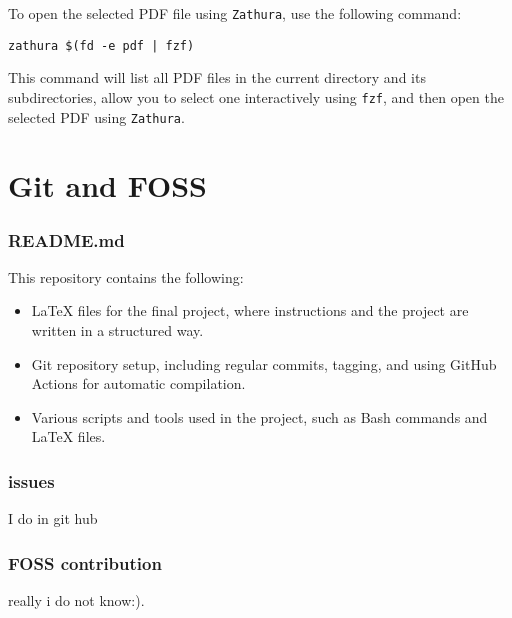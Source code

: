 \documentclass{article}
\begin{document}
To open the selected PDF file using \texttt{Zathura}, use the following command:

\begin{verbatim}
zathura $(fd -e pdf | fzf)
\end{verbatim}
This command will list all PDF files in the current directory and its subdirectories, allow you to select one interactively using \texttt{fzf}, and then open the selected PDF using \texttt{Zathura}.

\section{Git and FOSS}
\subsubsection{README.md}
This repository contains the following:

\begin{itemize}
    \item LaTeX files for the final project, where instructions and the project are written in a structured way.
    \item Git repository setup, including regular commits, tagging, and using GitHub Actions for automatic compilation.
    \item Various scripts and tools used in the project, such as Bash commands and LaTeX files.
\end{itemize}

\subsubsection{issues}
I do in git hub\\

\subsubsection{FOSS contribution}
really i do not know:).
\end{document}
